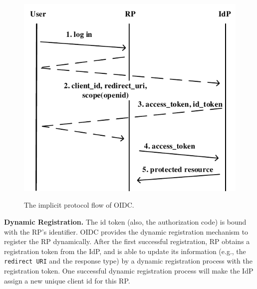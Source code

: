 \begin{figure}
  \centering
  \includegraphics[width=\linewidth]{fig/implicit.pdf}\label{fig:OpenID}
  \caption{The implicit protocol flow of OIDC.}
  \label{fig:OpenID}
\end{figure}

\noindent\textbf{Dynamic Registration.} The id token (also, the authorization code) is bound with the RP's identifier. OIDC provides the dynamic registration\cite{DynamicRegistration} mechanism to register the RP dynamically. After the first successful registration, RP obtains a registration token from the IdP, and is able to update its information (e.g., the \verb+redirect URI+ and the  response type) by a dynamic registration process with the  registration token. One successful dynamic registration process  will make the IdP assign a new unique client id for this RP.

